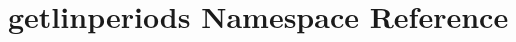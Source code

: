 \hypertarget{namespacegetlinperiods}{\section{getlinperiods Namespace Reference}
\label{namespacegetlinperiods}
}
